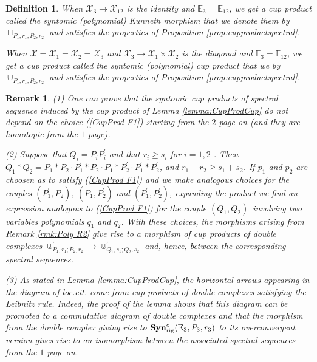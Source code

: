 \documentclass[asterisque,english]{smfart}
\newtheorem{definition}{Definition}[]
\newtheorem{remark}[theo]{Remark}
\begin{document}
\begin{definition}\label{def:CupProd Def1} 
When $\mathcal{X}_{3}\rightarrow \mathcal{X
}_{12}$ is the identity and $\mathbb{E}_3=\mathbb{E}_{12}$, we get a cup product called the {\em syntomic (polynomial) Kunneth morphism} that we denote them by $\sqcup _{P_{1},r_{1};P_{2},r_{2}}$ and satisfies the properties of Proposition \ref{prop:cupproductspectral}.

When $\mathcal{X}=\mathcal{X}_1=\mathcal{X}_2=\mathcal{X}_3$ and $\mathcal{X}_{3}\rightarrow \mathcal{X}_{1}\times \mathcal{X}_{2}$ is the
diagonal and $\mathbb{E}_3=\mathbb{E}_{12}$, we get   a cup product called the {\em syntomic
(polynomial) cup product} that we by $\cup
_{P_{1},r_{1};P_{2},r_{2}} $ and satisfies the properties of Proposition \ref{prop:cupproductspectral}.
\end{definition}

\begin{remark}\label{rmkPoly R4} (1) One can prove that the syntomic cup products of spectral sequence 
induced by the cup product of Lemma \ref{lemma:CupProdCup} do
not depend on the choice (\ref{CupProd F1}) starting
from the $2$-page on (and they are homotopic from the $1$-page).

(2) Suppose that $Q_{i}=P_{i}P_{i}^{\prime }$ and that $r_{i}\geq s_{i}$ for $i=1,2$ . Then $Q_{1}\ast Q_{2}=P_{1}\ast P_{2}\cdot P_{1}^{\prime }\ast P_{2}\cdot P_{1}\ast P_{2}^{\prime }\cdot P_{1}^{\prime }\ast P_{2}^{\prime }$, and $r_{1}+r_{2}\geq s_{1}+s_{2}$. If $p_{1}$ and $p_{2}$ are choosen as to satisfy (\ref{CupProd F1}) and we make analogous choices for the couples $\left( P_{1}^{\prime },P_{2}\right) $, $\left( P_{1},P_{2}^{\prime }\right) $ and $\left( P_{1}^{\prime },P_{2}^{\prime }\right) $, expanding the product we find an expression analogous to (\ref{CupProd F1})  for the couple $\left( Q_{1},Q_{2}\right) $\ involving two variables polynomials $q_{1}$ and $q_{2}$. With these choices, the morphisms arising from Remark \ref{rmk:Poly R2} give rise to a morphism of cup products of double complexes $\Cup _{P_{1},r_{1};P_{2},r_{2}}^{\prime }\rightarrow \Cup _{Q_{1},s_{1};Q_{2},s_{2}}^{\prime }$ and, hence, between the corresponding spectral sequences.

(3) As stated in Lemma \ref{lemma:CupProdCup}, the horizontal arrows appearing
in the diagram of loc.cit. come from cup products of double complexes
satisfying the Leibnitz rule. Indeed, the proof of the lemma shows that this
diagram can be promoted to a commutative diagram of double complexes and
that the morphism from the double complex giving rise to $\mathbf{Syn}_{%
\mathrm{rig}}^{c}(\mathbb{E}_{3},P_{3},r_{3})$ to its overconvergent version
gives rise to an isomorphism between the associated spectral sequences from
the $1$-page on.
\end{remark}
\end{document}
